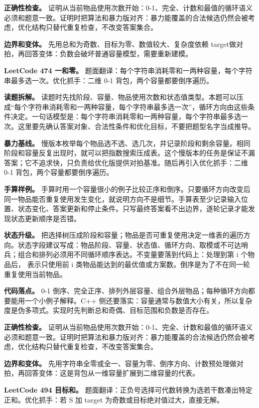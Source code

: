 \textbf{正确性检查。} 证明从当前物品使用次数开始：0-1、完全、计数和最值的循环语义必须和题意一致。证明时把算法和暴力版对齐：暴力能覆盖的合法候选仍然会被考虑，优化结构只替代重复检查，不改变答案集合。

\textbf{边界和变体。} 先用总和为奇数、目标为零、数值较大、复杂度依赖 target做对拍，再回答变体：负数会破坏普通容量模型，需要重新建模。

\noindent\textbf{LeetCode 474 一和零。} 题面翻译：每个字符串消耗零和一两种容量，每个字符串最多选一次。优化抓手：二维 0-1 背包，两个容量都要倒序遍历。

\textbf{读题拆解。} 读题时先找阶段、容量、物品使用次数和状态值类型。本题可以压成“每个字符串消耗零和一两种容量，每个字符串最多选一次”，循环方向由这些条件决定。一句话模型是：每个字符串消耗零和一两种容量，每个字符串最多选一次。这里要先确认答案对象、合法性条件和优化目标，不要把题型名字当成推导。

\textbf{暴力基线。} 慢版本枚举每个物品选不选、选几次，并记录阶段和剩余容量。相同阶段和容量反复出现时，就可以把指数搜索压成表。这个慢版本的任务是保证不漏答案；它不追求快，只负责给优化版提供对拍基准。随后再引入优化抓手：二维 0-1 背包，两个容量都要倒序遍历。

\textbf{手算样例。} 手算时用一个容量很小的例子比较正序和倒序。只要循环方向改变后同一物品能否重复使用发生变化，就说明方向不是细节。手算表至少记录输入位置、状态变化、答案更新和停止条件。只写最终答案看不出边界，逐轮记录才能发现状态更新顺序是否错。

\textbf{状态升级。} 把选择树压成阶段和容量；物品是否可重复使用决定一维表的遍历方向。状态字段建议写成：物品阶段、容量、状态值、循环方向、取模或不可达哨兵；组合和排列必须用不同循环顺序表达。不变量要落到代码上：处理到第 i 个物品后， 表示只使用前 i 类物品能达到的最优值或方案数。倒序是为了不在同一轮重复使用当前物品。

\textbf{代码落点。} 0-1 倒序、完全正序、排列外层容量、组合外层物品；每种循环方向都要能用一个小例子解释。C++ 侧还要落实：容量通常与数值大小有关，所以复杂度是伪多项式。实现时先判断总和奇偶、目标范围和负数是否存在。

\textbf{正确性检查。} 证明从当前物品使用次数开始：0-1、完全、计数和最值的循环语义必须和题意一致。证明时把算法和暴力版对齐：暴力能覆盖的合法候选仍然会被考虑，优化结构只替代重复检查，不改变答案集合。

\textbf{边界和变体。} 先用字符串全零或全一、容量为零、倒序方向、计数预处理做对拍，再回答变体：这是背包从一维容量扩展到二维容量的代表。

\noindent\textbf{LeetCode 494 目标和。} 题面翻译：正负号选择可代数转换为选若干数凑出特定正和。优化抓手：若 S 加 target 为奇数或目标绝对值过大，直接无解。

